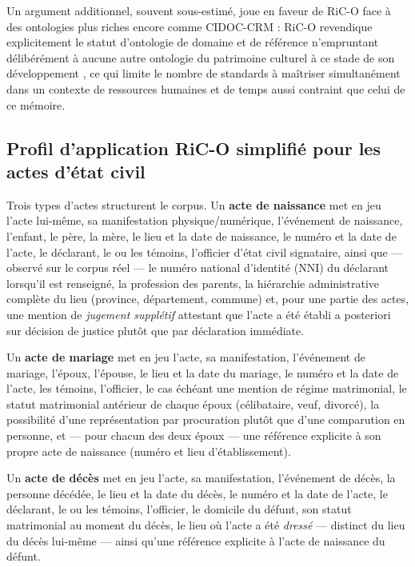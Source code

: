 Un argument additionnel, souvent sous-estimé, joue en faveur de RiC-O face à des ontologies plus riches encore comme CIDOC-CRM : RiC-O revendique explicitement le statut d'\og ontologie de domaine et de référence \fg{} n'empruntant délibérément à aucune autre ontologie du patrimoine culturel à ce stade de son développement \cite{icaegad2025rico11}, ce qui limite le nombre de standards à maîtriser simultanément dans un contexte de ressources humaines et de temps aussi contraint que celui de ce mémoire.

\subsection{Profil d'application RiC-O simplifié pour les actes d'état civil}

Trois types d'actes structurent le corpus. Un \textbf{acte de naissance} met en jeu l'acte lui-même, sa manifestation physique/numérique, l'événement de naissance, l'enfant, le père, la mère, le lieu et la date de naissance, le numéro et la date de l'acte, le déclarant, le ou les témoins, l'officier d'état civil signataire, ainsi que --- observé sur le corpus réel --- le numéro national d'identité (NNI) du déclarant lorsqu'il est renseigné, la profession des parents, la hiérarchie administrative complète du lieu (province, département, commune) et, pour une partie des actes, une mention de \textit{jugement supplétif} attestant que l'acte a été établi a posteriori sur décision de justice plutôt que par déclaration immédiate.

Un \textbf{acte de mariage} met en jeu l'acte, sa manifestation, l'événement de mariage, l'époux, l'épouse, le lieu et la date du mariage, le numéro et la date de l'acte, les témoins, l'officier, le cas échéant une mention de régime matrimonial, le statut matrimonial antérieur de chaque époux (célibataire, veuf, divorcé), la possibilité d'une représentation par procuration plutôt que d'une comparution en personne, et --- pour chacun des deux époux --- une référence explicite à son propre acte de naissance (numéro et lieu d'établissement).

Un \textbf{acte de décès} met en jeu l'acte, sa manifestation, l'événement de décès, la personne décédée, le lieu et la date du décès, le numéro et la date de l'acte, le déclarant, le ou les témoins, l'officier, le domicile du défunt, son statut matrimonial au moment du décès, le lieu où l'acte a été \emph{dressé} --- distinct du lieu du décès lui-même --- ainsi qu'une référence explicite à l'acte de naissance du défunt.

